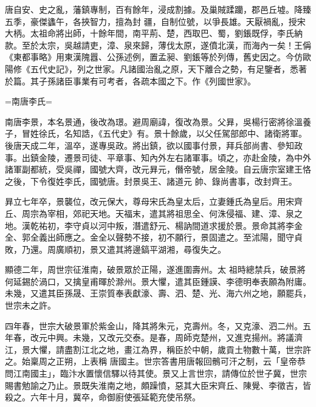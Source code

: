 
\begin{pinyinscope}

 唐自安、史之亂，藩鎮專制，百有餘年，浸成割據。及巢賊蹂躪，郡邑丘墟。降臻五季，豪傑蠭午，各挾智力，擅為封
 疆，自制位號，以爭長雄。天厭禍亂，授宋大柄。太祖命將出師，十餘年間，南平荊、楚，西取巴、蜀，劉鋹既俘，李氏納款。至於太宗，吳越請吏，漳、泉來歸，薄伐太原，遂僨北漢，而海內一矣！王偁《東都事略》用東漢隗囂、公孫述例，置孟昶、劉鋹等於列傳，舊史因之。今仿歐陽修《五代史記》，列之世家。凡諸國治亂之原，天下離合之勢，有足鑒者，悉著於篇。其子孫諸臣事業有可考者，各疏本國之下。作《列國世家》。



 =南唐李氏=



 南唐李景，本名景通，後改為璟。避周廟諱，復改為景。父昪，吳楊行密將徐溫養子，冒姓徐氏，名知誥，《五代史》有。景十餘歲，以父任駕部郎中、諸衛將軍。後唐天成二年，溫卒，遂專吳政。將出鎮，欲以國事付景，拜兵部尚書、參知政事。出鎮金陵，遷景司徒、平章事、知內外左右諸軍事。頃之，亦赴金陵，為中外諸軍副都統，受吳禪，國號大齊，改元昪元，僭帝號，居金陵。自云唐宗室建王恪之後，下令復姓李氏，國號唐。封景吳王、諸道元
 帥、錄尚書事，改封齊王。



 昪立七年卒，景襲位，改元保大，尊母宋氏為皇太后，立妻鍾氏為皇后。用宋齊丘、周宗為宰相，郊祀天地。天福末，遣其將祖思全、何洙侵福、建、漳、泉之地。漢乾祐初，李守貞以河中叛，潛遣舒元、楊訥間道求援於景。景命其將李金全、郭全義出師應之。金全以聲勢不接，初不願行，景固遣之。至沭陽，聞守貞敗，乃還。周廣順初，景又遣其將邊鎬平湖湘，尋復失之。



 顯德二年，周世宗征淮南，破景眾於正陽，遂進圍壽州。太
 祖時總禁兵，破景將何延錫於渦口，又擒皇甫暉於滁州。景大懼，遣其臣鍾謨、李德明奉表願為附庸。未幾，又遣其臣孫晟、王崇質奉表獻濠、壽、泗、楚、光、海六州之地，願罷兵，世宗未之許。



 四年春，世宗大破景軍於紫金山，降其將朱元，克壽州。冬，又克濠、泗二州。五年春，改元中興。未幾，又改元交泰。是春，周師克楚州，又進克揚州。將議濟江，景大懼，請盡割江北之地，畫江為界，稱臣於中朝，歲貢土物數十萬，世宗許之。始稟周之正朔，上表稱
 唐國主。世宗答書用唐報回鶻可汗之制，云「皇帝恭問江南國主」，臨汴水置懷信驛以待其使。景又上言世宗，請傳位於世子冀，世宗賜書勉諭之乃止。景既失淮南之地，頗躁憤，惡其大臣宋齊丘、陳覺、李徵吉，皆殺之。六年十月，冀卒，命御廚使張延範充使吊祭。




\end{pinyinscope}
